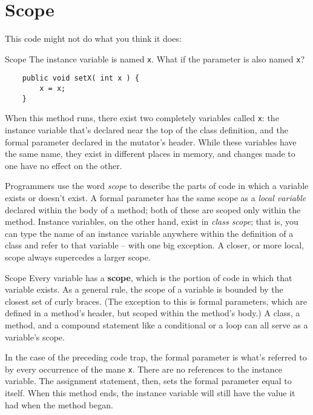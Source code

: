 \section{Scope}

This code might not do what you think it does:

\begin{trap}{Scope}
    The instance variable is named \texttt{x}.  What if the parameter is also named \texttt{x}?
    \begin{verbatim}
    public void setX( int x ) {
        x = x;
    }
    \end{verbatim}
\end{trap}

When this method runs, there exist two completely variables called \texttt{x}: the instance variable that's declared near the top of the class definition, and the formal parameter declared in the mutator's header.  While these variables have the same name, they exist in different places in memory, and changes made to one have no effect on the other.

Programmers use the word \textit{scope} to describe the parts of code in which a variable exists or doesn't exist.  A formal parameter has the same scope as a \textit{local variable} declared within the body of a method; both of these are scoped only within the method.  Instance variables, on the other hand, exist in \textit{class scope}; that is, you can type the name of an instance variable anywhere within the definition of a class and refer to that variable -- with one big exception.  A closer, or more local, scope always supercedes a larger scope.

\begin{defn}{Scope}
    Every variable has a \textbf{scope}, which is the portion of code in which that variable exists.  As a general rule, the scope of a variable is bounded by the closest set of curly braces.  (The exception to this is formal parameters, which are defined in a method's header, but scoped within the method's body.)  A class, a method, and a compound statement like a conditional or a loop can all serve as a variable's scope.
\end{defn}

In the case of the preceding code trap, the formal parameter is what's referred to by every occurrence of the mane \texttt{x}.  There are no references to the instance variable.  The assignment statement, then, sets the formal parameter equal to itself.  When this method ends, the instance variable will still have the value it had when the method began.

